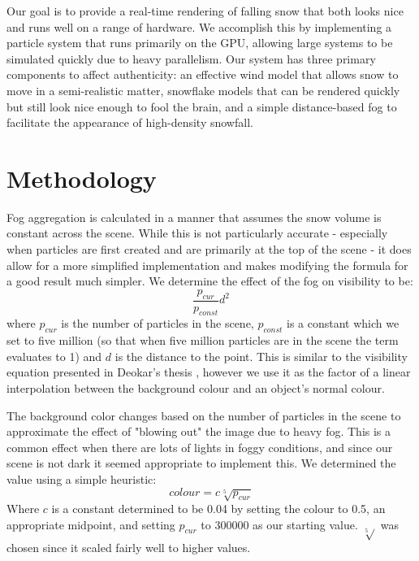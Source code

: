 \documentclass[conference]{acmsiggraph}
\begin{document}
Our goal is to provide a real-time rendering of falling snow that both looks nice and runs well on a range of hardware. We accomplish this by implementing a particle system that runs primarily on the GPU, allowing large systems to be simulated quickly due to heavy parallelism. Our system has three primary components to affect authenticity: an effective wind model that allows snow to move in a semi-realistic matter, snowflake models that can be rendered quickly but still look nice enough to fool the brain, and a simple distance-based fog to facilitate the appearance of high-density snowfall.

\section{Methodology}
Fog aggregation is calculated in a manner that assumes the snow volume is constant across the scene. While this is not particularly accurate - especially when particles are first created and are primarily at the top of the scene - it does allow for a more simplified implementation and makes modifying the formula for a good result much simpler. We determine the effect of the fog on visibility to be:
\begin{equation} \label{eq:fog}
\frac{p_{cur}}{p_{const}}d^2
\end{equation}
where $p_{cur}$ is the number of particles in the scene, $p_{const}$ is a constant which we set to five million (so that when five million particles are in the scene the term evaluates to 1) and $d$ is the distance to the point. This is similar to the visibility equation presented in Deokar's thesis \cite{deokar09}, however we use it as the factor of a linear interpolation between the background colour and an object's normal colour.

The background color changes based on the number of particles in the scene to approximate the effect of "blowing out" the image due to heavy fog. This is a common effect when there are lots of lights in foggy conditions, and since our scene is not dark it seemed appropriate to implement this. We determined the value using a simple heuristic:
\begin{equation} \label{eq:bgcolor}
colour = c\sqrt[5]{p_{cur}}
\end{equation}
Where $c$ is a constant determined to be 0.04 by setting the colour to 0.5, an appropriate midpoint, and setting $p_{cur}$ to 300000 as our starting value. $\sqrt[5]{}$ was chosen since it scaled fairly well to higher values.
\end{document}
